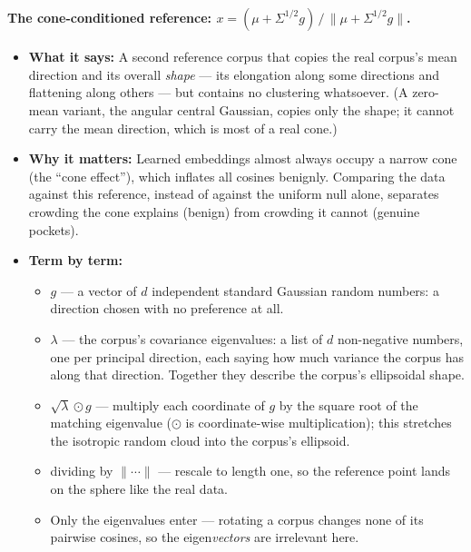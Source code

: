 \documentclass[11pt,letterpaper]{article}
\begin{document}
\paragraph{The cone-conditioned reference: $x = (\mu + \Sigma^{1/2}
g)\,/\,\lVert \mu + \Sigma^{1/2} g \rVert$.}
\begin{itemize}
  \item \textbf{What it says:} A second reference corpus that copies the
  real corpus's mean direction and its overall \emph{shape} --- its
  elongation along some directions and flattening along others --- but
  contains no clustering whatsoever. (A zero-mean variant, the angular
  central Gaussian, copies only the shape; it cannot carry the mean
  direction, which is most of a real cone.)
  \item \textbf{Why it matters:} Learned embeddings almost always occupy a
  narrow cone (the ``cone effect''), which inflates all cosines benignly.
  Comparing the data against this reference, instead of against the
  uniform null alone, separates crowding the cone explains (benign) from
  crowding it cannot (genuine pockets).
  \item \textbf{Term by term:}
  \begin{itemize}
    \item $g$ --- a vector of $d$ independent standard Gaussian random
    numbers: a direction chosen with no preference at all.
    \item $\lambda$ --- the corpus's covariance eigenvalues: a list of $d$
    non-negative numbers, one per principal direction, each saying how much
    variance the corpus has along that direction. Together they describe
    the corpus's ellipsoidal shape.
    \item $\sqrt{\lambda} \odot g$ --- multiply each coordinate of $g$ by
    the square root of the matching eigenvalue ($\odot$ is coordinate-wise
    multiplication); this stretches the isotropic random cloud into the
    corpus's ellipsoid.
    \item dividing by $\lVert \cdots \rVert$ --- rescale to length one, so
    the reference point lands on the sphere like the real data.
    \item Only the eigenvalues enter --- rotating a corpus changes none of
    its pairwise cosines, so the eigen\emph{vectors} are irrelevant here.
  \end{itemize}
\end{itemize}
\end{document}
